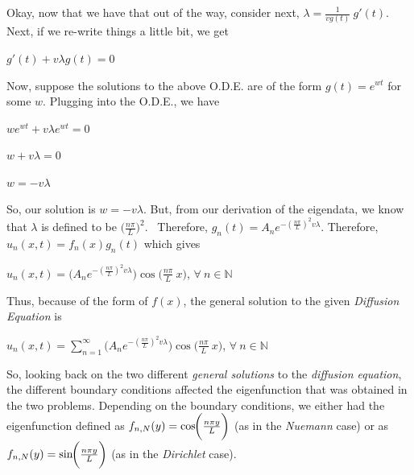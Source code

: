 \documentclass[12pt, executivepaper]{article}
\begin{document}
\begin{flushleft}
\vspace{3mm}

Okay, now that we have that out of the way, consider next, $\lambda=\frac{1}{vg(t)} \ g'(t)$. Next, if we re-write things a little bit, we get

\begin{center}

$g'(t)+v \lambda g(t)=0$

\end{center}

Now, suppose the solutions to the above O.D.E. are of the form $g(t)=e^{wt}$ for some $w$. Plugging into the O.D.E., we have

\begin{center}

$we^{wt}+v \lambda e^{wt}=0$

\vspace{2mm}

$w+v \lambda=0$

\vspace{2mm}

$w=-v \lambda$

\end{center}

So, our solution is $w=-v \lambda$. But, from our derivation of the eigendata, we know that $\lambda$ is defined to be $\bigg(\frac{n\pi}{L}\bigg)^2$. {~}Therefore, $g_{n}(t)=A_{n}e^{-(\frac{n\pi}{L})^2 v \lambda}$. Therefore, $u_{n}(x,t)=f_{n}(x)g_{n}(t)$ which gives

\begin{center}

$u_{n}(x,t)=\bigg(A_{n}e^{-(\frac{n\pi}{L})^2 v \lambda}\bigg) \cos\bigg(\frac{n \pi}{L} \ x\bigg)$, $\forall {~} n \in \mathbb{N}$

\end{center}

Thus, because of the form of $f(x)$, the general solution to the given \textit{Diffusion Equation} is

\pagebreak

\vspace*{-40mm}

\begin{center}

$u_{n}(x,t)=\sum_{n=1}^{\infty}\bigg(A_{n}e^{-(\frac{n\pi}{L})^2 v \lambda}\bigg) \cos\bigg(\frac{n \pi}{L} \ x\bigg)$, $\forall {~} n \in \mathbb{N}$

\end{center}

So, looking back on the two different \textit{general solutions} to the \textit{diffusion equation}, the different boundary conditions affected the eigenfunction that was obtained in the two problems. Depending on the boundary conditions, we either had the eigenfunction defined as $f_{n,N}(y)=\cos \hspace{-1mm} \bigg(\frac{n \pi y}{L}\bigg)$ (as in the \textit{Nuemann} case) or as $f_{n,N}(y)=\sin \hspace{-1mm} \bigg(\frac{n \pi y}{L}\bigg)$ (as in the \textit{Dirichlet} case).

\end{flushleft}
\end{document}
